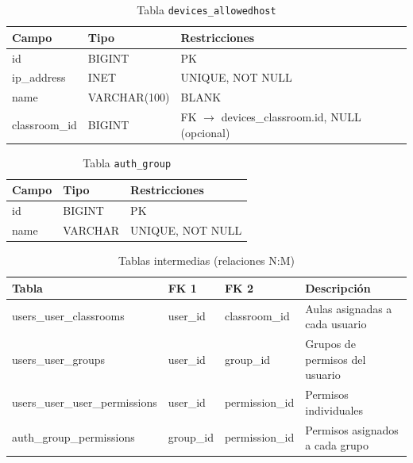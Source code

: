 \documentclass[12pt, a4paper, twoside]{article}
\begin{document}
\begin{table}[H]
\centering
\caption{Tabla \texttt{devices\_allowedhost}}
\begin{tabularx}{\textwidth}{llX}
  \toprule
  \textbf{Campo} & \textbf{Tipo} & \textbf{Restricciones} \\
  \midrule
  id            & BIGINT       & PK \\
  ip\_address   & INET         & UNIQUE, NOT NULL \\
  name          & VARCHAR(100) & BLANK \\
  classroom\_id & BIGINT       & FK $\to$ devices\_classroom.id, NULL (opcional) \\
  \bottomrule
\end{tabularx}
\end{table}

\begin{table}[H]
\centering
\caption{Tabla \texttt{auth\_group}}
\begin{tabularx}{\textwidth}{llX}
  \toprule
  \textbf{Campo} & \textbf{Tipo} & \textbf{Restricciones} \\
  \midrule
  id   & BIGINT  & PK \\
  name & VARCHAR & UNIQUE, NOT NULL \\
  \bottomrule
\end{tabularx}
\end{table}

\begin{table}[H]
\centering
\caption{Tablas intermedias (relaciones N:M)}
\begin{tabularx}{\textwidth}{lllX}
  \toprule
  \textbf{Tabla} & \textbf{FK 1} & \textbf{FK 2} & \textbf{Descripción} \\
  \midrule
  users\_user\_classrooms & user\_id & classroom\_id & Aulas asignadas a cada usuario \\
  users\_user\_groups     & user\_id & group\_id     & Grupos de permisos del usuario \\
  users\_user\_user\_permissions & user\_id & permission\_id & Permisos individuales \\
  auth\_group\_permissions & group\_id & permission\_id & Permisos asignados a cada grupo \\
  \bottomrule
\end{tabularx}
\end{table}
\end{document}
